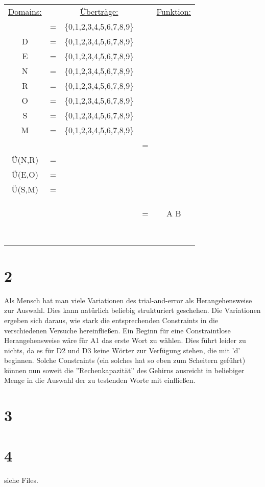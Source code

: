 \documentclass[a4paper,11pt,fleqn]{scrartcl}
\begin{document}
\quad \\

\begin{tabular}{ccccc}

\underline{Domains:} && \underline{Überträge:} && 
\underline{Funktion:} \\	
\(
\begin{array}{lcl}
	 Y &=& \{0,1,2,3,4,5,6,7,8,9\} \\
	 D &=& \{0,1,2,3,4,5,6,7,8,9\} \\
	 E &=& \{0,1,2,3,4,5,6,7,8,9\} \\
	 N &=& \{0,1,2,3,4,5,6,7,8,9\} \\
	 R &=& \{0,1,2,3,4,5,6,7,8,9\} \\
	 O &=& \{0,1,2,3,4,5,6,7,8,9\} \\
	 S &=& \{0,1,2,3,4,5,6,7,8,9\} \\
	 M &=& \{0,1,2,3,4,5,6,7,8,9\} \\
\end{array}
\)

&\quad &

\(
\begin{array}{lcl}
	Ü(D,E) &=& \lfloor \frac{D+E}{10} \rfloor \\
	Ü(N,R) &=& \lfloor \frac{N+R+Ü(D,E)}{10} \rfloor \\
	Ü(E,O) &=& \lfloor \frac{E+O+Ü(N,R)}{10} \rfloor \\
	Ü(S,M) &=& \lfloor \frac{S+M+Ü(E,O)}{10} \rfloor \\
	\\ \\ \\
\end{array}
\)

&\quad &

\(
\begin{array}{lcl}
	F(A,B)&=& A \neq B \\
	\\ \\ \\ \\ \\ \\ \\ 
\end{array}
\)
\end{tabular}


\section*{2}
Als Mensch hat man viele Variationen des trial-and-error als Herangehensweise zur Auswahl.
Dies kann natürlich beliebig strukturiert geschehen.
Die Variationen ergeben sich daraus, wie stark die entsprechenden Constraints in die verschiedenen Versuche hereinfließen.
Ein Beginn für eine Constraintlose Herangehensweise wäre für A1 das erste Wort zu wählen.
Dies führt leider zu nichts, da es für D2 und D3 keine Wörter zur Verfügung stehen, die mit 'd' beginnen.
Solche Constraints (ein solches hat so eben zum Scheitern geführt) können nun soweit die ''Rechenkapazität'' des Gehirns ausreicht in beliebiger Menge in die Auswahl der zu testenden Worte mit einfließen. 


\section*{3}
\section*{4}
	siehe Files.
\end{document}

